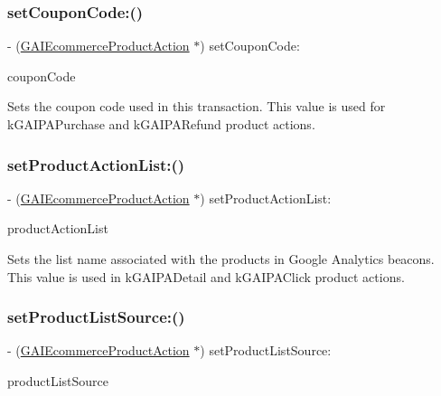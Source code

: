 \subsubsection{\texorpdfstring{set\+Coupon\+Code\+:()}{setCouponCode:()}}
{\footnotesize\ttfamily -\/ (\hyperlink{interface_g_a_i_ecommerce_product_action}{G\+A\+I\+Ecommerce\+Product\+Action} $\ast$) set\+Coupon\+Code\+: \begin{DoxyParamCaption}\item[{(N\+S\+String $\ast$)}]{coupon\+Code }\end{DoxyParamCaption}}

Sets the coupon code used in this transaction. This value is used for k\+G\+A\+I\+P\+A\+Purchase and k\+G\+A\+I\+P\+A\+Refund product actions. \mbox{\label{interface_g_a_i_ecommerce_product_action_a96a1aaedd949a9fb524916ef830728c0}} 
\subsubsection{\texorpdfstring{set\+Product\+Action\+List\+:()}{setProductActionList:()}}
{\footnotesize\ttfamily -\/ (\hyperlink{interface_g_a_i_ecommerce_product_action}{G\+A\+I\+Ecommerce\+Product\+Action} $\ast$) set\+Product\+Action\+List\+: \begin{DoxyParamCaption}\item[{(N\+S\+String $\ast$)}]{product\+Action\+List }\end{DoxyParamCaption}}

Sets the list name associated with the products in Google Analytics beacons. This value is used in k\+G\+A\+I\+P\+A\+Detail and k\+G\+A\+I\+P\+A\+Click product actions. \mbox{\label{interface_g_a_i_ecommerce_product_action_a9fd6cd67e0032ed2cec4e4ba222146c8}} 
\subsubsection{\texorpdfstring{set\+Product\+List\+Source\+:()}{setProductListSource:()}}
{\footnotesize\ttfamily -\/ (\hyperlink{interface_g_a_i_ecommerce_product_action}{G\+A\+I\+Ecommerce\+Product\+Action} $\ast$) set\+Product\+List\+Source\+: \begin{DoxyParamCaption}\item[{(N\+S\+String $\ast$)}]{product\+List\+Source }\end{DoxyParamCaption}}

